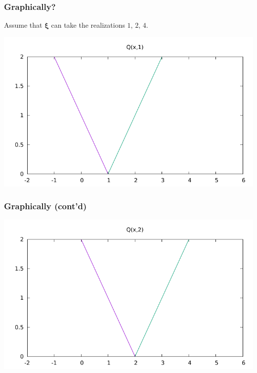 \documentclass{beamer}
\def\bxi{\boldsymbol\xi}
\def\bxi{\boldsymbol\xi}
\begin{document}
\begin{frame}
\frametitle{Graphically?}

Assume that $\bxi$ can take the realizations $1$, $2$, $4$.

\begin{center}
\begin{minipage}{0.9\textwidth}
\includegraphics[width=\textwidth]{recourse_1.pdf}
\end{minipage}
\end{center}

\end{frame}

\begin{frame}
\frametitle{Graphically (cont'd)}

\begin{center}
\begin{minipage}{0.9\textwidth}
\includegraphics[width=\textwidth]{recourse_2.pdf}
\end{minipage}
\end{center}

\end{frame}
\end{document}
